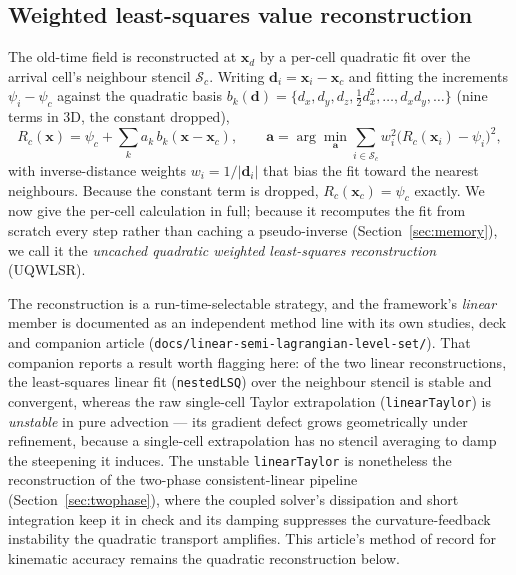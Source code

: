 \documentclass[preprint,3p,11pt]{elsarticle}
\newcommand{\psilev}{\psi}                       %
\newcommand{\xd}{\mathbf{x}_d}                    %
\newcommand{\xc}{\mathbf{x}_c}                    %
\begin{document}
\subsection{Weighted least-squares value reconstruction}
\label{sec:recon}
The old-time field is reconstructed at $\xd$ by a per-cell quadratic fit over the
arrival cell's neighbour stencil $\mathcal{S}_c$. Writing
$\mathbf{d}_i=\mathbf{x}_i-\xc$ and fitting the increments $\psilev_i-\psilev_c$
against the quadratic basis $b_k(\mathbf{d})=\{d_x,d_y,d_z,\tfrac12 d_x^2,\dots,d_xd_y,\dots\}$
(nine terms in 3D, the constant dropped),
\begin{equation}
  R_c(\mathbf{x}) = \psilev_c + \sum_{k} a_k\, b_k(\mathbf{x}-\xc), \qquad
  \mathbf{a} = \arg\min_{\mathbf{a}} \sum_{i\in\mathcal{S}_c}
      w_i^{2}\bigl(R_c(\mathbf{x}_i)-\psilev_i\bigr)^2 ,
  \label{eq:wlsq}
\end{equation}
with inverse-distance weights $w_i=1/\lvert\mathbf{d}_i\rvert$ that bias the fit toward
the nearest neighbours. Because the constant term is dropped, $R_c(\xc)=\psilev_c$
exactly. We now give the per-cell calculation in full; because it recomputes the fit
from scratch every step rather than caching a pseudo-inverse
(Section~\ref{sec:memory}), we call it the \emph{uncached quadratic weighted
least-squares reconstruction} (UQWLSR).

The reconstruction is a run-time-selectable strategy, and the framework's
\emph{linear} member is documented as an independent method line with its own
studies, deck and companion article (\texttt{docs/linear-semi-lagrangian-level-set/}).
That companion reports a result worth flagging here: of the two linear
reconstructions, the least-squares linear fit (\texttt{nestedLSQ}) over the
neighbour stencil is stable and convergent, whereas the raw single-cell Taylor
extrapolation (\texttt{linearTaylor}) is \emph{unstable} in pure advection --- its
gradient defect grows geometrically under refinement, because a single-cell
extrapolation has no stencil averaging to damp the steepening it induces. The
unstable \texttt{linearTaylor} is nonetheless the reconstruction of the two-phase
consistent-linear pipeline (Section~\ref{sec:twophase}), where the coupled solver's
dissipation and short integration keep it in check and its damping suppresses the
curvature-feedback instability the quadratic transport amplifies. This article's
method of record for kinematic accuracy remains the quadratic reconstruction below.
\end{document}
